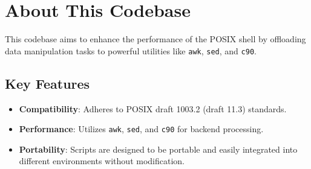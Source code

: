 \section{About This Codebase}
This codebase aims to enhance the performance of the POSIX shell by offloading data manipulation tasks to powerful utilities like \texttt{awk}, \texttt{sed}, and \texttt{c90}.

\subsection{Key Features}
\begin{itemize}
    \item \textbf{Compatibility}: Adheres to POSIX draft 1003.2 (draft 11.3) standards.
    \item \textbf{Performance}: Utilizes \texttt{awk}, \texttt{sed}, and \texttt{c90} for backend processing.
    \item \textbf{Portability}: Scripts are designed to be portable and easily integrated into different environments without modification.
\end{itemize}
\newpage
